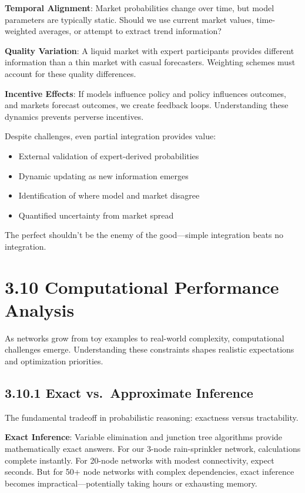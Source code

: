 \documentclass[
  11pt,
  letterpaper,
]{book}
\providecommand{\tightlist}{%
  \setlength{\itemsep}{0pt}\setlength{\parskip}{0pt}}
\begin{document}
\textbf{Temporal Alignment}: Market probabilities change over time, but
model parameters are typically static. Should we use current market
values, time-weighted averages, or attempt to extract trend information?

\textbf{Quality Variation}: A liquid market with expert participants
provides different information than a thin market with casual
forecasters. Weighting schemes must account for these quality
differences.

\textbf{Incentive Effects}: If models influence policy and policy
influences outcomes, and markets forecast outcomes, we create feedback
loops. Understanding these dynamics prevents perverse incentives.

Despite challenges, even partial integration provides value:

\begin{itemize}
\tightlist
\item
  External validation of expert-derived probabilities
\item
  Dynamic updating as new information emerges
\item
  Identification of where model and market disagree
\item
  Quantified uncertainty from market spread
\end{itemize}

The perfect shouldn't be the enemy of the good---simple integration
beats no integration.

\section{3.10 Computational Performance
Analysis}\label{sec-computational-performance-analysis}

As networks grow from toy examples to real-world complexity,
computational challenges emerge. Understanding these constraints shapes
realistic expectations and optimization priorities.

\subsection{3.10.1 Exact vs.~Approximate
Inference}\label{sec-exact-approximate}

The fundamental tradeoff in probabilistic reasoning: exactness versus
tractability.

\textbf{Exact Inference}: Variable elimination and junction tree
algorithms provide mathematically exact answers. For our 3-node
rain-sprinkler network, calculations complete instantly. For 20-node
networks with modest connectivity, expect seconds. But for 50+ node
networks with complex dependencies, exact inference becomes
impractical---potentially taking hours or exhausting memory.
\end{document}
